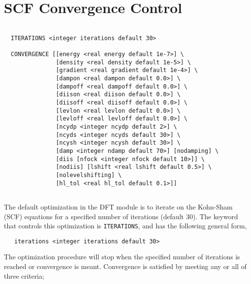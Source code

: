 \section{SCF Convergence Control}
\begin{verbatim}

  ITERATIONS <integer iterations default 30>

  CONVERGENCE [[energy <real energy default 1e-7>] \
               [density <real density default 1e-5>] \
               [gradient <real gradient default 1e-4>] \
               [dampon <real dampon default 0.0>] \
               [dampoff <real dampoff default 0.0>] \
               [diison <real diison default 0.0>] \
               [diisoff <real diisoff default 0.0>] \
               [levlon <real levlon default 0.0>] \
               [levloff <real levloff default 0.0>] \
               [ncydp <integer ncydp default 2>] \
               [ncyds <integer ncyds default 30>] \
               [ncysh <integer ncysh default 30>] \
               [damp <integer ndamp default 70>] [nodamping] \
               [diis [nfock <integer nfock default 10>]] \
               [nodiis] [lshift <real lshift default 0.5>] \
               [nolevelshifting] \
               [hl_tol <real hl_tol default 0.1>]]


\end{verbatim}

The default optimization in the DFT module is to iterate on the 
Kohn-Sham (SCF) equations for a specified number of iterations
(default 30).  The keyword that controls this optimization 
is \verb+ITERATIONS+, and has the following general form,

\begin{verbatim}
   iterations <integer iterations default 30>
\end{verbatim}

The optimization procedure will stop when the specified number of
iterations is reached or convergence is meant.  Convergence is
satisfied by meeting any or all of three criteria; 

